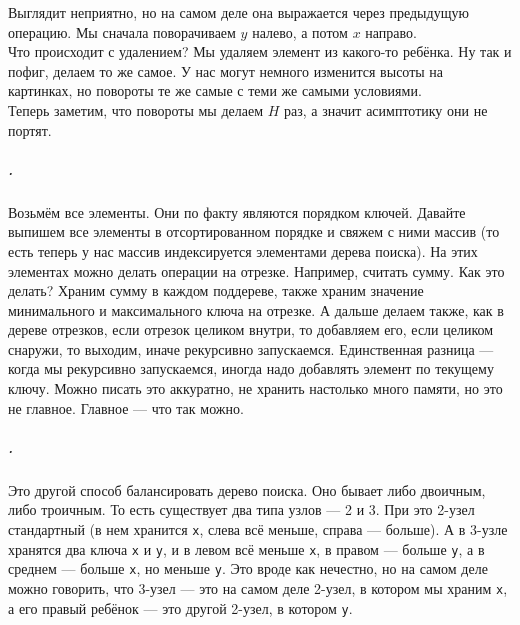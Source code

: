 \documentclass{article}
\newcommand{\pseudo}{PseudoLexer.py:PseudoLexer -x}
\newcommand{\pseudocode}[1]{\texttt{#1}}
\begin{document}
    Выглядит неприятно, но на самом деле она выражается через предыдущую операцию. Мы сначала поворачиваем $y$ налево, а потом $x$ направо.\\
    Что происходит с удалением? Мы удаляем элемент из какого-то ребёнка. Ну так и пофиг, делаем то же самое. У нас могут немного изменится высоты на картинках, но повороты те же самые с теми же самыми условиями.\\
    Теперь заметим, что повороты мы делаем $H$ раз, а значит асимптотику они не портят.
    \subparagraph{.}
    Возьмём все элементы. Они по факту являются порядком ключей. Давайте выпишем все элементы в отсортированном порядке и свяжем с ними массив (то есть теперь у нас массив индексируется элементами дерева поиска). На этих элементах можно делать операции на отрезке. Например, считать сумму. Как это делать? Храним сумму в каждом поддереве, также храним значение минимального и максимального ключа на отрезке. А дальше делаем также, как в дереве отрезков, если отрезок целиком внутри, то добавляем его, если целиком снаружи, то выходим, иначе рекурсивно запускаемся. Единственная разница --- когда мы рекурсивно запускаемся, иногда надо добавлять элемент по текущему ключу. Можно писать это аккуратно, не хранить настолько много памяти, но это не главное. Главное --- что так можно.
    \subparagraph{.}
    Это другой способ балансировать дерево поиска. Оно бывает либо двоичным, либо троичным. То есть существует два типа узлов --- 2 и 3. При это 2-узел стандартный (в нем хранится \pseudocode{x}, слева всё меньше, справа --- больше). А в 3-узле хранятся два ключа \pseudocode{x} и \pseudocode{y}, и в левом всё меньше \pseudocode{x}, в правом --- больше \pseudocode{y}, а в среднем --- больше \pseudocode{x}, но меньше \pseudocode{y}. Это вроде как нечестно, но на самом деле можно говорить, что 3-узел --- это на самом деле 2-узел, в котором мы храним \pseudocode{x}, а его правый ребёнок --- это другой 2-узел, в котором \pseudocode{y}.
\end{document}
